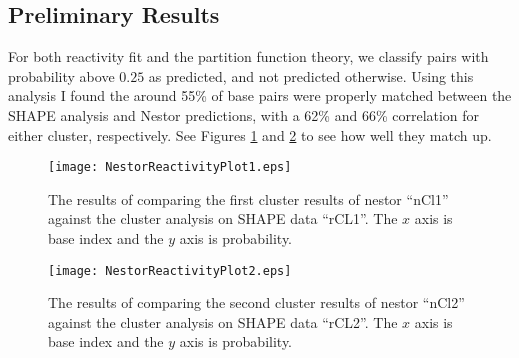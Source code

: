 \subsection{Preliminary Results}

For both reactivity fit and the partition function theory, we classify
pairs with probability above $0.25$ as predicted, and not predicted
otherwise. Using this analysis I found the around 55\% of base pairs
were properly matched between the SHAPE analysis and Nestor
predictions, with a 62\% and 66\% correlation for either cluster,
respectively. See Figures \ref{fig:nestResults1} and
\ref{fig:nestResults2} to see how well they match up.
\begin{figure}[t] 
\texttt{[image: NestorReactivityPlot1.eps]}
\caption[Nestor vs Reactivity Cluster 1]{The results of comparing the first cluster results of nestor
  ``nCl1'' against the cluster analysis on SHAPE data ``rCL1''. The
  $x$ axis is base index and the $y$ axis is probability.}
\label{fig:nestResults1}
\end{figure}

\begin{figure}[t]
\texttt{[image: NestorReactivityPlot2.eps]}
\caption[Nestor vs Reactivity Cluster 2]{The results of comparing the second cluster results of nestor
  ``nCl2'' against the cluster analysis on SHAPE data ``rCL2''. The $x$
  axis is base index and the $y$ axis is probability.}
\label{fig:nestResults2}
\end{figure}




